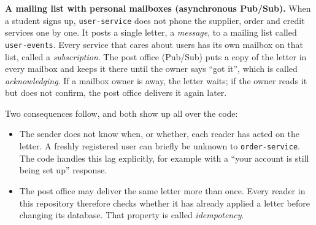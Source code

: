 \documentclass[11pt,a4paper]{article}
\newcommand{\code}[1]{\nolinkurl{#1}}
\begin{document}
\textbf{A mailing list with personal mailboxes (asynchronous Pub/Sub).} When a student
signs up, \code{user-service} does not phone the supplier, order and credit services one
by one. It posts a single letter, a \emph{message}, to a mailing list called
\code{user-events}. Every service that cares about users has its own mailbox on that
list, called a \emph{subscription}. The post office (Pub/Sub) puts a copy of the letter
in every mailbox and keeps it there until the owner says ``got it'', which is called
\emph{acknowledging}. If a mailbox owner is away, the letter waits; if the owner
reads it but does not confirm, the post office delivers it again later.

Two consequences follow, and both show up all over the code:
\begin{itemize}
  \item The sender does not know when, or whether, each reader has acted on the
  letter. A freshly registered user can briefly be unknown to \code{order-service}. The
  code handles this lag explicitly, for example with a ``your account is still being set
  up'' response.
  \item The post office may deliver the same letter more than once. Every reader in
  this repository therefore checks whether it has already applied a letter before
  changing its database. That property is called \emph{idempotency}.
\end{itemize}
\end{document}
